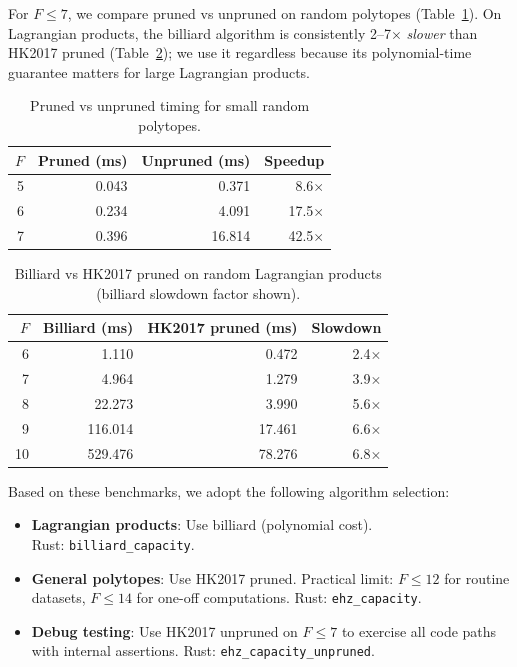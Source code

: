 For $F \le 7$, we compare pruned vs unpruned on random polytopes
(Table~\ref{tab:pruned-vs-unpruned}). On Lagrangian products, the billiard
algorithm is consistently 2--7$\times$ \emph{slower} than HK2017 pruned
(Table~\ref{tab:billiard-vs-hk2017}); we use it regardless because its
polynomial-time guarantee matters for large Lagrangian products.

\begin{table}[h]
\centering
\begin{tabular}{rrrr}
\toprule
$F$ & Pruned (ms) & Unpruned (ms) & Speedup \\
\midrule
 5 &  0.043 &  0.371 &  8.6$\times$ \\
 6 &  0.234 &  4.091 & 17.5$\times$ \\
 7 &  0.396 & 16.814 & 42.5$\times$ \\
\bottomrule
\end{tabular}
\caption{Pruned vs unpruned timing for small random polytopes.}
\label{tab:pruned-vs-unpruned}
\end{table}

\begin{table}[h]
\centering
\begin{tabular}{rrrr}
\toprule
$F$ & Billiard (ms) & HK2017 pruned (ms) & Slowdown \\
\midrule
 6 &   1.110 &  0.472 &  2.4$\times$ \\
 7 &   4.964 &  1.279 &  3.9$\times$ \\
 8 &  22.273 &  3.990 &  5.6$\times$ \\
 9 & 116.014 & 17.461 &  6.6$\times$ \\
10 & 529.476 & 78.276 &  6.8$\times$ \\
\bottomrule
\end{tabular}
\caption{Billiard vs HK2017 pruned on random Lagrangian products (billiard slowdown factor shown).}
\label{tab:billiard-vs-hk2017}
\end{table}

Based on these benchmarks, we adopt the following algorithm selection:

\begin{itemize}
  \item \textbf{Lagrangian products}: Use billiard (polynomial cost).\\
    Rust: \texttt{billiard\_capacity}.
  \item \textbf{General polytopes}: Use HK2017 pruned.
    Practical limit: $F \le 12$ for routine datasets,
    $F \le 14$ for one-off computations.
    Rust: \texttt{ehz\_\allowbreak capacity}.
  \item \textbf{Debug testing}: Use HK2017 unpruned on $F \le 7$ to exercise
    all code paths with internal assertions.
    Rust: \texttt{ehz\_\allowbreak capacity\_\allowbreak unpruned}.
\end{itemize}

